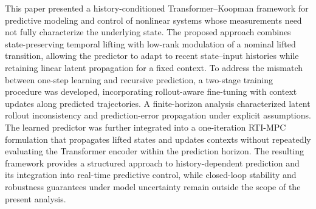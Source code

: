 \documentclass[journal]{IEEEtran}
\begin{document}
This paper presented a history-conditioned Transformer--Koopman framework for predictive modeling and control of nonlinear systems whose measurements need not fully characterize the underlying state. The proposed approach combines state-preserving temporal lifting with low-rank modulation of a nominal lifted transition, allowing the predictor to adapt to recent state--input histories while retaining linear latent propagation for a fixed context. To address the mismatch between one-step learning and recursive prediction, a two-stage training procedure was developed, incorporating rollout-aware fine-tuning with context updates along predicted trajectories. A finite-horizon analysis characterized latent rollout inconsistency and prediction-error propagation under explicit assumptions. The learned predictor was further integrated into a one-iteration RTI-MPC formulation that propagates lifted states and updates contexts without repeatedly evaluating the Transformer encoder within the prediction horizon. The resulting framework provides a structured approach to history-dependent prediction and its integration into real-time predictive control, while closed-loop stability and robustness guarantees under model uncertainty remain outside the scope of the present analysis.
\end{document}
